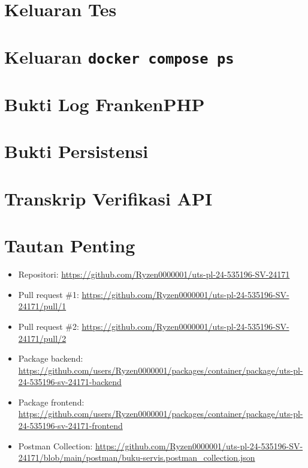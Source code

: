 \documentclass[12pt,a4paper,oneside]{book}
\begin{document}
\section{Keluaran Tes}
\label{lam:test}


\section{Keluaran \texttt{docker compose ps}}
\label{lam:ps}


\section{Bukti Log FrankenPHP}
\label{lam:franken}


\section{Bukti Persistensi}
\label{lam:persistensi}


\section{Transkrip Verifikasi API}
\label{lam:api}


\section{Tautan Penting}

\begin{itemize}[leftmargin=1.2cm]
  \item Repositori: \url{https://github.com/Ryzen0000001/uts-pl-24-535196-SV-24171}
  \item Pull request \#1: \url{https://github.com/Ryzen0000001/uts-pl-24-535196-SV-24171/pull/1}
  \item Pull request \#2: \url{https://github.com/Ryzen0000001/uts-pl-24-535196-SV-24171/pull/2}
  \item Package backend: \url{https://github.com/users/Ryzen0000001/packages/container/package/uts-pl-24-535196-sv-24171-backend}
  \item Package frontend: \url{https://github.com/users/Ryzen0000001/packages/container/package/uts-pl-24-535196-sv-24171-frontend}
  \item Postman Collection: \url{https://github.com/Ryzen0000001/uts-pl-24-535196-SV-24171/blob/main/postman/buku-servis.postman_collection.json}
\end{itemize}
\end{document}
